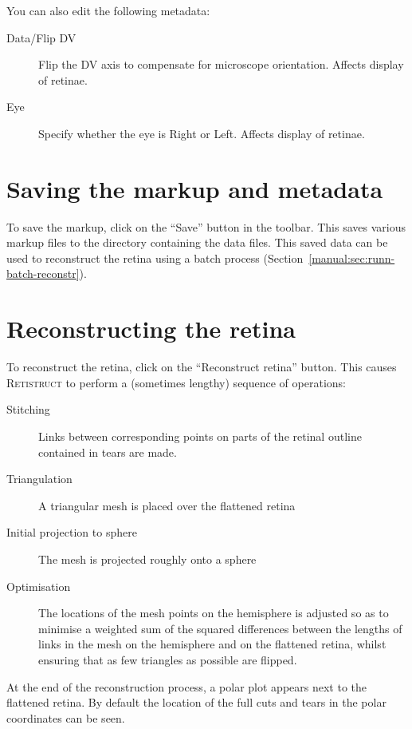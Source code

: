 \documentclass{book}
\begin{document}
You can also edit the following metadata:

\begin{description}
\item[Data/Flip DV] Flip the DV axis to compensate for microscope
  orientation. Affects display of retinae.
\item[Eye] Specify whether the eye is Right or Left.  Affects display
  of retinae.
\end{description}

\section{Saving the markup and metadata}
\label{manual:sec:saving-markup}

To save the markup, click on the ``Save'' button in the toolbar. This
saves various markup files to the directory containing the
data files. This saved data can be used to reconstruct the retina using
a batch process (Section~\ref{manual:sec:runn-batch-reconstr}).

\section{Reconstructing the retina}
\label{manual:sec:reconstr-retina}

To reconstruct the retina, click on the ``Reconstruct retina'' button.
This causes \textsc{Retistruct} to perform a (sometimes lengthy)
sequence of operations:
\begin{description}
\item[Stitching] Links between corresponding points on parts of the retinal
  outline  contained in tears are made.
\item[Triangulation] A triangular mesh is placed over the flattened retina
\item[Initial projection to sphere ] The mesh is projected roughly
  onto a sphere
\item[Optimisation] The locations of the mesh points on the hemisphere
  is adjusted so as to minimise a weighted sum of the squared
  differences between the lengths of links in the mesh on the
  hemisphere and on the flattened retina, whilst ensuring that as few
  triangles as possible are flipped.
\end{description}

At the end of the reconstruction process, a polar plot appears next to
the flattened retina. By default the location of
the full cuts and tears in the polar coordinates can be seen.
\end{document}
